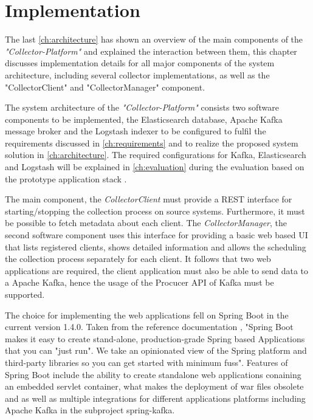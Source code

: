 \chapter{Implementation}
\label{ch:implementation}
The last \autoref{ch:architecture} has shown an overview of the main components of
the \textit{"Collector-Platform"} and explained the interaction between them, this chapter discusses implementation
details for all major components of the system architecture, including several
collector implementations, as well as the "CollectorClient" and "CollectorManager" component.

The system architecture of the \textit{"Collector-Platform"} consists two software components to
be implemented, the Elasticsearch database, Apache Kafka message broker and the Logstash
indexer to be configured to fulfil the requirements discussed in \autoref{ch:requirements} and to realize the
proposed system solution in \autoref{ch:architecture}. The required configurations for Kafka, Elasticsearch and Logstash
will be explained in \autoref{ch:evaluation} during the evaluation based on the prototype application stack .

The main component, the \textit{CollectorClient} must provide a REST interface for starting/stopping the collection process
on source systems. Furthermore, it must be possible to fetch metadata about each client. The \textit{CollectorManager},
the second software component uses this interface for providing a basic web based UI that lists registered
clients, shows detailed information and allows the scheduling the collection process separately
for each client. It follows that two web applications are required, the client application must also be able to
send data to a Apache Kafka, hence the usage of the Procucer API of Kafka must be supported.

The choice for implementing the web applications fell on Spring Boot in the current version 1.4.0. Taken from
the reference documentation \cite{SpringB16}, "Spring Boot makes it easy to create stand-alone, production-grade
Spring based Applications that you can "just run". We take an opinionated view of the Spring platform and
third-party libraries so you can get started with minimum fuss". Features of Spring Boot include the ability to create
standalone web applications conaining an embedded servlet container, what makes the deployment of war files obsolete
and as well as multiple integrations for different applications platforms including Apache Kafka in the subproject spring-kafka.

